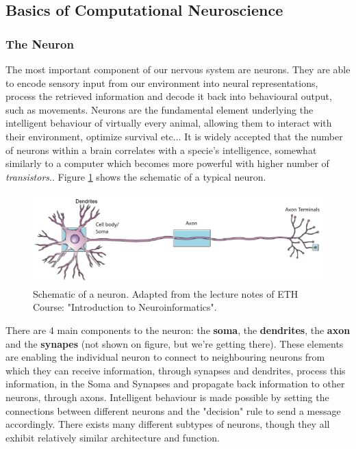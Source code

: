 \subsection{Basics of Computational Neuroscience}

\label{sec:neurons_synapses}

\subsubsection{The Neuron}

The most important component of our nervous system are neurons. They are able to encode sensory input from our environment into neural representations, process the retrieved information and decode it back into behavioural output, such as movements. Neurons are the fundamental element underlying the intelligent behaviour of virtually every animal, allowing them to interact with their environment, optimize survival etc... It is widely accepted that the number of neurons within a brain correlates with a specie's intelligence, somewhat similarly to a computer which becomes more powerful with higher number of \textit{transistors}.. Figure \ref{fig:schematic_neuron} shows the schematic of a typical neuron.\\

\begin{figure}
    \centering
    \includegraphics[width=\linewidth]{Figures/neuron_schematic.png}
    \caption{Schematic of a neuron. Adapted from the lecture notes of ETH Course: "Introduction to Neuroinformatics".}
    \label{fig:schematic_neuron}
\end{figure}

There are 4 main components to the neuron: the \textbf{soma}, the \textbf{dendrites}, the \textbf{axon} and the \textbf{synapes} (not shown on figure, but we're getting there). These elements are enabling the individual neuron to connect to neighbouring neurons from which they can receive information, through synapses and dendrites, process this information, in the Soma and Synapses and propagate back information to other neurons, through axons. Intelligent behaviour is made possible by setting the connections between different neurons and the "decision" rule to send a message accordingly. There exists many different subtypes of neurons, though they all exhibit relatively similar architecture and function. 

